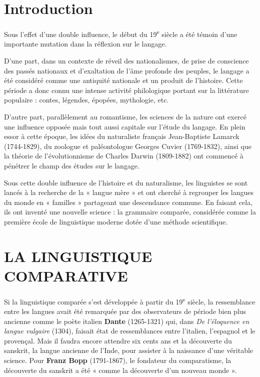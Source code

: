 \section*{Introduction}
Sous l’effet d’une double influence, le début du 19\textsuperscript{e} siècle a été témoin d’une importante mutation dans la réflexion sur le langage.

D’une part, dans un contexte de réveil des nationalismes, de prise de conscience des passés nationaux et d’exaltation de l’âme profonde des peuples, le langage a été considéré comme une antiquité nationale et un produit de l’histoire. Cette période a donc connu une intense activité philologique portant sur la littérature populaire : contes, légendes, épopées, mythologie, etc.

D’autre part, parallèlement au romantisme, les sciences de la nature ont exercé une influence opposée mais tout aussi capitale sur l’étude du langage. En plein essor à cette époque, les idées du naturaliste français Jean-Baptiste Lamarck (1744-1829), du zoologue et paléontologue Georges Cuvier (1769-1832), ainsi que la théorie de l’évolutionnisme de Charles Darwin (1809-1882) ont commencé à pénétrer le champ des études sur le langage.

Sous cette double influence de l’histoire et du naturalisme, les linguistes se sont lancés à la recherche de la « langue mère » et ont cherché à regrouper les langues du monde en « familles » partageant une descendance commune. En faisant cela, ils ont inventé une nouvelle science : la grammaire comparée, considérée comme la première école de linguistique moderne dotée d’une méthode scientifique.

\section{LA LINGUISTIQUE COMPARATIVE}
Si la linguistique comparée s’est développée à partir du 19\textsuperscript{e} siècle, la ressemblance entre les langues avait été remarquée par des observateurs de période bien plus ancienne comme le poète italien \textbf{Dante} (1265-1321) qui, dans \textit{De l’éloquence en langue vulgaire} (1304), faisait état de ressemblances entre l’italien, l’espagnol et le provençal. Mais il faudra encore attendre six cents ans et la découverte du sanskrit, la langue ancienne de l’Inde, pour assister à la naissance d’une véritable science. Pour \textbf{Franz Bopp} (1791-1867), le fondateur du comparatisme, la découverte du sanskrit a été « comme la découverte d’un nouveau monde ».

